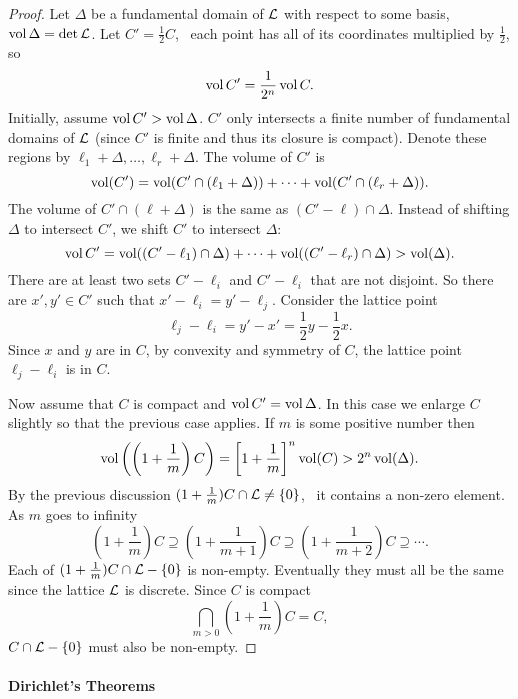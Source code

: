 \begin{proof}
Let $\Delta$ be a fundamental domain of ${\cal L}$ with respect to some basis,
$\mathop{\rm vol}\nolimits \Delta = \det {\cal L}$.  Let $C' = \frac{1}{2}C$, \ie\ each point has
all of its coordinates multiplied by $\frac{1}{2}$, so 
\[
\mathop{\rm vol}\nolimits C' = \frac{1}{2^{n}} \mathop{\rm vol}\nolimits C.
\]
Initially, assume $\mathop{\rm vol}\nolimits C' > \mathop{\rm vol}\nolimits \Delta$.  $C'$ only intersects a
finite number of fundamental domains of ${\cal L}$ (since $C'$ is finite and
thus its closure is compact).  Denote these regions by
$\ell_{1}+\Delta, \ldots, \ell_{r}+\Delta$.  The volume of $C'$ is 
\begin{equation}
\mathop{\rm vol}\nolimits(C') = \mathop{\rm vol}\nolimits(C' \cap (\ell_{1}+\Delta)) + \cdots +
\mathop{\rm vol}\nolimits(C' \cap (\ell_{r}+\Delta)).
\label{Mink:Vol:Eq}
\end{equation}
The volume of $C' \cap (\ell + \Delta)$ is the same as $(C' - \ell) \cap
\Delta$.  Instead of shifting $\Delta$ to intersect $C'$, we shift $C'$
to intersect $\Delta$:
\[
\mathop{\rm vol}\nolimits C' = \mathop{\rm vol}\nolimits((C' - \ell_{1}) \cap \Delta) + \cdots +
\mathop{\rm vol}\nolimits((C' - \ell_{r}) \cap \Delta)
> \mathop{\rm vol}\nolimits(\Delta).
\]
There are at least two sets $C' - \ell_{i}$ and $C' -\ell_{i}$ that are
not disjoint.  So there are $x', y' \in C'$ such that $x' - \ell_{i} = y' -
\ell_{j}$.  Consider the lattice point 
\[
\ell_{j} - \ell_{i} = y' - x' = \frac{1}{2}y - \frac{1}{2}x.
\]
Since $x$ and $y$ are in $C$, by convexity and symmetry of $C$, the
lattice point $\ell_{j} - \ell_{i}$ is in $C$.

Now assume that $C$ is compact and  $\mathop{\rm vol}\nolimits C' = \mathop{\rm vol}\nolimits \Delta$.  In this case we enlarge $C$
slightly so that the previous case applies.  If $m$ is some positive number
then
\[
\mathop{\rm vol}\nolimits\left(\left(1+\frac{1}{m}\right)C\right) = \left[1+\frac{1}{m}\right]^{n} \mathop{\rm vol}\nolimits(C)
> 2^{n} \mathop{\rm vol}\nolimits(\Delta).
\]
By the previous discussion $(1+\frac{1}{m})C \cap {\cal L} \not= \{0\}$, \ie\
it contains a non-zero element.  As $m$ goes to infinity
\[
\left(1+\frac{1}{m}\right)C \supseteq \left(1+\frac{1}{m+1}\right)C 
\supseteq \left(1+\frac{1}{m+2}\right)C \supseteq \cdots.
\]
Each of $(1+\frac{1}{m})C \cap {\cal L} -\{0\}$ is non-empty.  Eventually they
must all be the same since the lattice ${\cal L}$ is discrete.  Since $C$ is compact
\[
\bigcap_{m>0} \left(1+ \frac{1}{m}\right) C = C,
\]
$C \cap {\cal L} - \{0\}$ must also be non-empty.
\end{proof}

\paragraph{Dirichlet's Theorems}

